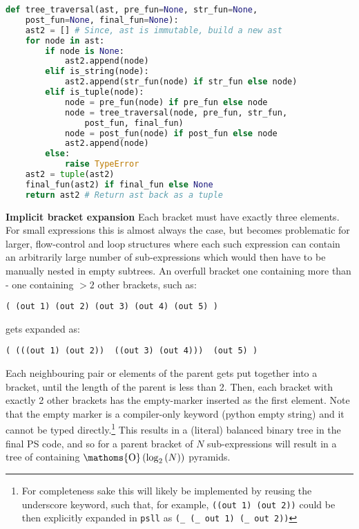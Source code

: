 \documentclass[aip,jcp,reprint,footinbib]{revtex4-1}
\DeclareMathOperator{\bigO}{\ensuremath{\mathoms{O}}}
\let\tt\texttt
\newcommand\psll{\texttt{psll}\xspace}
\begin{document}
\begin{lstlisting}[language=python,
    label={lst:tree_traversal},caption={
    Core \psll function performing a depth-first walk through the abstract syntax tree and application of appropriate functions.
}]
def tree_traversal(ast, pre_fun=None, str_fun=None,
    post_fun=None, final_fun=None):
    ast2 = [] # Since, ast is immutable, build a new ast
    for node in ast:
        if node is None:
            ast2.append(node)
        elif is_string(node):
            ast2.append(str_fun(node) if str_fun else node)
        elif is_tuple(node):
            node = pre_fun(node) if pre_fun else node
            node = tree_traversal(node, pre_fun, str_fun, 
                post_fun, final_fun)
            node = post_fun(node) if post_fun else node
            ast2.append(node)
        else:
            raise TypeError
    ast2 = tuple(ast2)
    final_fun(ast2) if final_fun else None
    return ast2 # Return ast back as a tuple
\end{lstlisting}

\textbf{Implicit bracket expansion} Each bracket must have exactly three elements. For small expressions this is almost always the case, but becomes problematic for larger, flow-control and loop structures where each such expression can contain an arbitrarily large number of sub-expressions which would then have to be manually nested in empty subtrees. An overfull bracket one containing more than - one containing $>2$ other brackets, such as:
\begin{lstlisting}[language=psll,aboveskip=3pt,belowskip=-2pt,frame=none,numbers=none]
  ( (out 1) (out 2) (out 3) (out 4) (out 5) )
\end{lstlisting}
gets expanded as:
\begin{lstlisting}[language=psll,aboveskip=3pt,belowskip=-2pt,frame=none,numbers=none]
  ( (((out 1) (out 2))  ((out 3) (out 4)))  (out 5) )
\end{lstlisting}
Each neighbouring pair or elements of the parent gets put together into a bracket, until the length of the parent is less than 2. Then, each bracket with exactly 2 other brackets has the empty-marker inserted as the first element. Note that the empty marker is a compiler-only keyword (python empty string) and it cannot be typed directly.\footnote{For completeness sake this will likely be implemented by reusing the underscore keyword, such that, for example, \tt{((out 1) (out 2))} could be then explicitly expanded in \psll as \tt{(\_ (\_ out 1) (\_ out 2))}} This results in a (literal) balanced binary tree in the final PS code, and so for a parent bracket of $N$ sub-expressions will result in a tree of containing $\bigO\left(\log_2\left(N\right)\right)$ pyramids.
\end{document}

